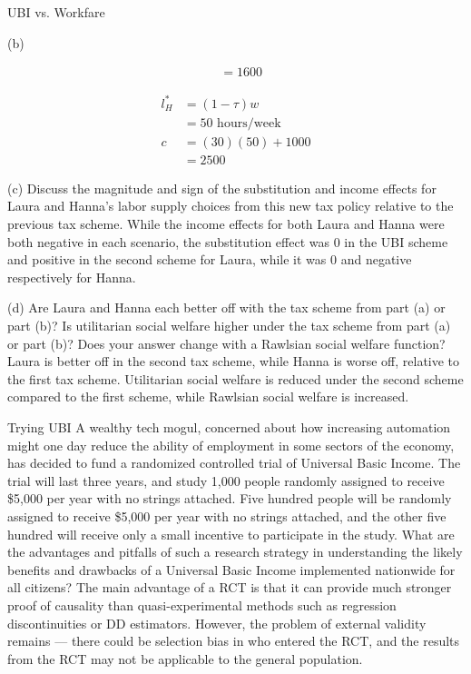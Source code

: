\documentclass[10pt]{extarticle}
\begin{document}
\begin{problem}{UBI vs. Workfare}
\begin{problem}{(b)}
\begin{description}[font=\normalfont]
\begin{align*}
                     &= 1600
          \end{align*}
        \item[Hanna's Labor Supply and Consumption:]
          \begin{align*}
            l^{\ast}_{H} &= (1-\tau)w\\
                         &= 50\text{ hours/week}\\
              c &= (30)(50) + 1000\\
              &= 2500
          \end{align*}
      \end{description}
    \end{problem}
    \begin{problem}{(c)}
      Discuss the magnitude and sign of the substitution and income effects for Laura and Hanna's labor supply choices from this new tax policy relative to the previous tax scheme.
      \tcblower
      While the income effects for both Laura and Hanna were both negative in each scenario, the substitution effect was $0$ in the UBI scheme and positive in the second scheme for Laura, while it was $0$ and negative respectively for Hanna.
    \end{problem}
    \begin{problem}{(d)}
      Are Laura and Hanna each better off with the tax scheme from part (a) or part (b)? Is utilitarian social welfare higher under the tax scheme from part (a) or part (b)? Does your answer change with a Rawlsian social welfare function?
      \tcblower
      Laura is better off in the second tax scheme, while Hanna is worse off, relative to the first tax scheme. Utilitarian social welfare is reduced under the second scheme compared to the first scheme, while Rawlsian social welfare is increased.
    \end{problem}
  \end{problem}
  \begin{problem}{Trying UBI}
    A wealthy tech mogul, concerned about how increasing automation might one day reduce the ability of employment in some sectors of the economy, has decided to fund a randomized controlled trial of Universal Basic Income. The trial will last three years, and study 1,000 people randomly assigned to receive \$5,000 per year with no strings attached. Five hundred people will be randomly assigned to receive \$5,000 per year with no strings attached, and the other five hundred will receive only a small incentive to participate in the study. What are the advantages and pitfalls of such a research strategy in understanding the likely benefits and drawbacks of a Universal Basic Income implemented nationwide for all citizens?
    \tcblower
    The main advantage of a RCT is that it can provide much stronger proof of causality than quasi-experimental methods such as regression discontinuities or DD estimators. However, the problem of external validity remains --- there could be selection bias in who entered the RCT, and the results from the RCT may not be applicable to the general population.
  \end{problem}
\end{document}
